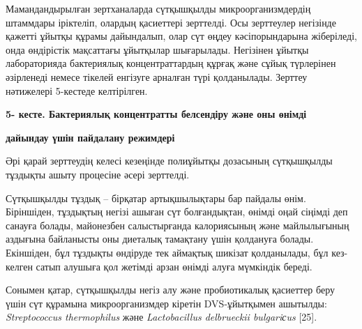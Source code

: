 {Мамандандырылған зертханаларда сүтқышқылды микроорганизмдердің штаммдары
іріктеліп, олардың қасиеттері зерттелді. Осы зерттеулер негізінде
қажетті ұйытқы құрамы дайындалып, олар сүт өңдеу кәсіпорындарына
жіберіледі, онда өндірістік мақсаттағы ұйытқылар шығарылады. Негізінен
ұйытқы лабораторияда бактериялық концентраттардың құрғақ және сұйық
түрлерінен әзірленеді немесе тікелей енгізуге арналған түрі қолданылады.
Зерттеу нәтижелері 5-кестеде келтірілген.

{\bfseries 5- кесте. Бактериялық концентратты белсендіру және оны өнімді}

{\bfseries дайындау үшін пайдалану режимдері}

% 
% 
% 
% 

Әрі қарай зерттеудің келесі кезеңінде полиұйытқы дозасының сүтқышқылды
тұздықты ашыту процесіне әсері зерттелді.

Сүтқышқылды тұздық -- бірқатар артықшылықтары бар пайдалы өнім.
Біріншіден, тұздықтың негізі ашыған сүт болғандықтан, өнімді оңай
сіңімді деп санауға болады, майонезбен салыстырғанда калориясының және
майлылығының аздығына байланысты оны диеталық тамақтану үшін қолдануға
болады. Екіншіден, бұл тұздықты өндіруде тек аймақтық шикізат
қолданылады, бұл кез-келген сатып алушыға қол жетімді арзан өнімді алуға
мүмкіндік береді.

Сонымен қатар, сүтқышқылды негіз алу және пробиотикалық қасиеттер беру
үшін сүт құрамына микроорганизмдер кіретін DVS-ұйытқымен ашытылды:
\emph{Streptococcus thermophilus} және \emph{Lactobacillus delbrueckii
bulgariсus} {[}25{]}.

}
